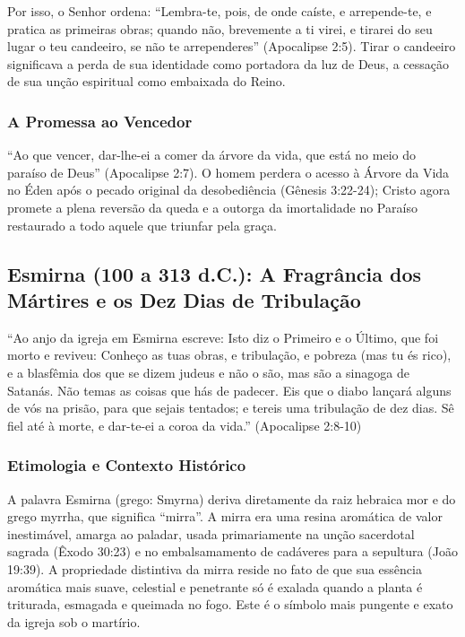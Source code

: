 Por isso, o Senhor ordena: ``Lembra-te, pois, de onde caíste, e arrepende-te, e pratica as primeiras obras; quando não, brevemente a ti virei, e tirarei do seu lugar o teu candeeiro, se não te arrependeres'' (Apocalipse 2:5). Tirar o candeeiro significava a perda de sua identidade como portadora da luz de Deus, a cessação de sua unção espiritual como embaixada do Reino.


\subsubsection*{A Promessa ao Vencedor}
``Ao que vencer, dar-lhe-ei a comer da árvore da vida, que está no meio do paraíso de Deus'' (Apocalipse 2:7). O homem perdera o acesso à Árvore da Vida no Éden após o pecado original da desobediência (Gênesis 3:22-24); Cristo agora promete a plena reversão da queda e a outorga da imortalidade no Paraíso restaurado a todo aquele que triunfar pela graça.



\subsection{Esmirna (100 a 313 d.C.): A Fragrância dos Mártires e os Dez Dias de Tribulação}


``Ao anjo da igreja em Esmirna escreve: Isto diz o Primeiro e o Último, que foi morto e reviveu: Conheço as tuas obras, e tribulação, e pobreza (mas tu és rico), e a blasfêmia dos que se dizem judeus e não o são, mas são a sinagoga de Satanás. Não temas as coisas que hás de padecer. Eis que o diabo lançará alguns de vós na prisão, para que sejais tentados; e tereis uma tribulação de dez dias. Sê fiel até à morte, e dar-te-ei a coroa da vida.'' (Apocalipse 2:8-10)


\subsubsection*{Etimologia e Contexto Histórico}
A palavra Esmirna (grego: Smyrna) deriva diretamente da raiz hebraica mor e do grego myrrha, que significa ``mirra''. A mirra era uma resina aromática de valor inestimável, amarga ao paladar, usada primariamente na unção sacerdotal sagrada (Êxodo 30:23) e no embalsamamento de cadáveres para a sepultura (João 19:39). A propriedade distintiva da mirra reside no fato de que sua essência aromática mais suave, celestial e penetrante só é exalada quando a planta é triturada, esmagada e queimada no fogo. Este é o símbolo mais pungente e exato da igreja sob o martírio.

